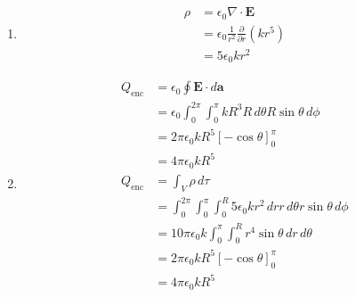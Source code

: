 \documentclass{article}
\renewcommand{\vec}[1]{\boldsymbol{\mathbf{#1}}}
\begin{document}
\subsection{}

\begin{enumerate}
  \item

        \begin{align*}
          \rho & = \epsilon_0 \nabla \cdot \vec{E}                              \\
               & = \epsilon_0 \frac{1}{r^2} \frac{\partial}{\partial r} (k r^5) \\
               & = 5 \epsilon_0 k r^2
        \end{align*}

  \item

        \begin{align*}
          Q_\text{enc} & = \epsilon_0 \oint \vec{E} \cdot d \vec{a}                                                        \\
                       & = \epsilon_0 \int_0^{2 \pi} \int_0^\pi k R^3 R \,d \theta R \sin \theta \,d \phi                  \\
                       & = 2 \pi \epsilon_0 k R^5 [-\cos \theta]_0^\pi                                                     \\
                       & = 4 \pi \epsilon_0 k R^5                                                                          \\
          Q_\text{enc} & = \int_V \rho \,d \tau                                                                            \\
                       & = \int_0^{2 \pi} \int_0^\pi \int_0^R 5 \epsilon_0 k r^2 \,d r r \,d \theta r \sin \theta \,d \phi \\
                       & = 10 \pi \epsilon_0 k \int_0^\pi \int_0^R r^4 \sin \theta \,d r \,d \theta                        \\
                       & = 2 \pi \epsilon_0 k R^5 [-\cos \theta]_0^\pi                                                     \\
                       & = 4 \pi \epsilon_0 k R^5
        \end{align*}
\end{enumerate}

\subsection{}
\end{document}
